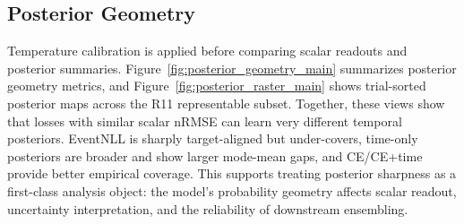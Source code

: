 \documentclass[12pt]{article}
\begin{document}
\begin{table}[!t]
\centering
\caption{Five-seed robustness summary for selected core models. Values are mean $\pm$ sample standard deviation over seeds 2025--2029; R11 range is min--max across seeds. Posterior scores are reported only for event-time segmentation runs. Lower is better for all metrics.}
\label{tab:seed_robustness}
\scriptsize
\setlength{\tabcolsep}{3pt}
\renewcommand{\arraystretch}{1.12}
\end{table}

\subsection{Posterior Geometry}

Temperature calibration is applied before comparing scalar readouts and posterior summaries. Figure~\ref{fig:posterior_geometry_main} summarizes posterior geometry metrics, and Figure~\ref{fig:posterior_raster_main} shows trial-sorted posterior maps across the R11 representable subset. Together, these views show that losses with similar scalar nRMSE can learn very different temporal posteriors. EventNLL is sharply target-aligned but under-covers, time-only posteriors are broader and show larger mode-mean gaps, and CE/CE+time provide better empirical coverage. This supports treating posterior sharpness as a first-class analysis object: the model's probability geometry affects scalar readout, uncertainty interpretation, and the reliability of downstream ensembling.
\end{document}
